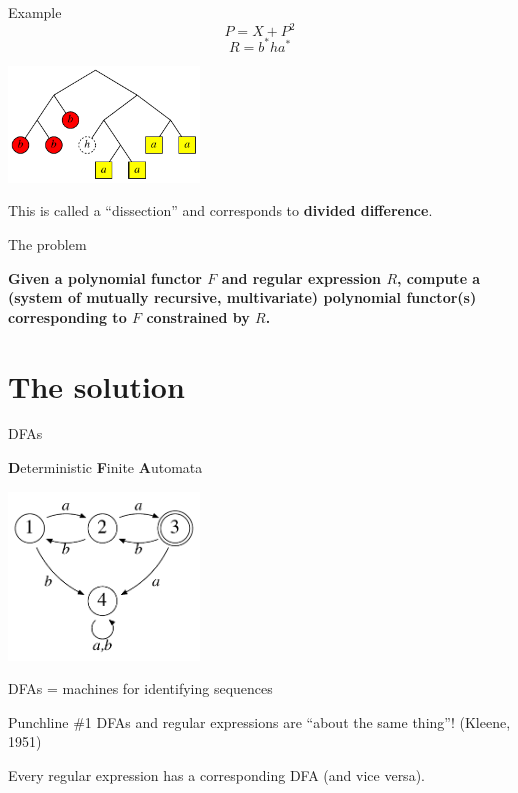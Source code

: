 \documentclass[xcolor=svgnames,12pt]{beamer}
\newenvironment{xframe}[1][]
  {\begin{frame}[fragile,environment=xframe,#1]}
  {\end{frame}}
\renewcommand{\emph}{\textbf}
\begin{document}
\begin{xframe}{Example}
  \[ P = X + P^2 \]
  \[ R = b^*ha^* \]
  \begin{center}
    \includegraphics[width=2in]{dissect-tree}

   This is called a ``dissection'' and corresponds to
  \emph{divided difference}.
  \end{center}
\end{xframe}

\begin{xframe}{The problem}
  \begin{center}
  \textbf{Given a polynomial functor $F$ and regular expression $R$, compute
  a (system of mutually recursive, multivariate) polynomial functor(s)
  corresponding to $F$ constrained by $R$.}
  \end{center}
\end{xframe}

\section{The solution}

\begin{xframe}{DFAs}
  \begin{center}
    \textbf{D}eterministic \textbf{F}inite \textbf{A}utomata \bigskip

    \includegraphics[width=2in]{example-DFA}

    DFAs = machines for identifying sequences
  \end{center}
\end{xframe}

\begin{xframe}{Punchline \#1}
  DFAs and regular expressions are ``about the same thing''! (Kleene,
  1951) \bigskip

  Every regular expression has a corresponding DFA (and vice versa).
\end{xframe}
\end{document}
